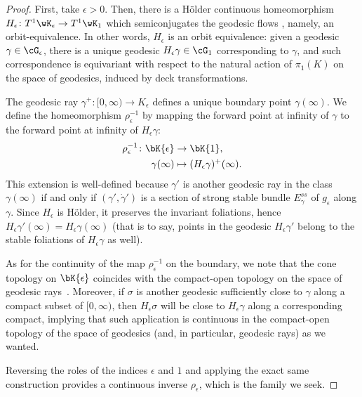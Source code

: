 \documentclass[reqno,11pt]{amsart}
\begin{document}
    \begin{proof}
    First, take \(\epsilon > 0.\) 
    Then, there is a Hölder continuous homeomorphism \(H_\epsilon\colon T^1\wK_\epsilon \to T^1\wK_1\) which semiconjugates the geodesic flows \cite{ghys_flots_1984}, namely, an orbit-equivalence. 
    In other words, \(H_\epsilon\) is an orbit equivalence: given a geodesic \(\gamma \in \cG_\epsilon\), there is a unique geodesic \(H_\epsilon\gamma \in \cG_1\) corresponding to \(\gamma\), and such correspondence is equivariant with respect to the natural action of \(\pi_1(K)\) on the space of geodesics, induced by deck transformations.
    \par The geodesic ray \(\gamma^+ \colon [0,\infty) \to K_\epsilon\) defines a unique boundary point \(\gamma(\infty)\). 
    We define the homeomorphism $\rho_\epsilon^{-1}$ by mapping the forward point at infinity of \(\gamma\) to the forward point at infinity of $H_\epsilon\gamma$:
    \begin{align*}
        \rho_\epsilon^{-1}\colon \bK{\epsilon} &\to \bK{1},\\
                \gamma(\infty) &\mapsto (H_\epsilon\gamma)^+(\infty).
    \end{align*}    
    This extension is well-defined because \(\gamma'\) is another geodesic ray in the class \(\gamma(\infty)\) if and only if \((\gamma',\dot\gamma')\) is a section of strong stable bundle \(E^{ss}_\gamma\) of \(g_\epsilon\) along \(\gamma\).
    Since \(H_\epsilon\) is Hölder, it preserves the invariant foliations, hence \(H_\epsilon\gamma'(\infty) = H_\epsilon\gamma(\infty)\) (that is to say, points in the geodesic \(H_\epsilon\gamma'\) belong to the stable foliations of \(H_\epsilon\gamma\) as well).
    \par As for the continuity of the map \(\rho_\epsilon^{-1}\) on the boundary, we note that the cone topology on \(\bK{\epsilon}\) coincides with the compact-open topology on the space of geodesic rays~\cite[Chapter II.8]{bridson2011metric}. 
    Moreover, if \(\sigma\) is another geodesic sufficiently close to \(\gamma\) along a compact subset of \([0,\infty)\), then \(H_\epsilon\sigma\) will be close to \(H_\epsilon\gamma\) along a corresponding compact, implying that such application is continuous in the compact-open topology of the space of geodesics (and, in particular, geodesic rays) as we wanted.
    \par Reversing the roles of the indices \(\epsilon\) and \(1\) and applying the exact same construction provides a continuous inverse \(\rho_\epsilon\), which is the family we seek. 


\end{proof}
\end{document}
